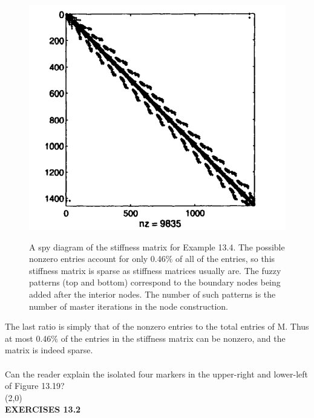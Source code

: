 \documentclass[../main.tex]{subfiles}
\begin{document}
\begin{figure}[H]
\includegraphics[width=0.9\linewidth]{4}
	\centering
	\label{pfig:ch13_1}
	\caption{A spy diagram of the stiffness matrix for Example 13.4. The possible 
nonzero entries account for only 0.46$\%$ of all of the entries, so this stiffness matrix is sparse 
as stiffness matrices usually are. The fuzzy patterns (top and bottom) correspond to the 
boundary nodes being added after the interior nodes. The number of such patterns is the 
number of master iterations in the node construction.}
\end{figure}
The last ratio is simply that of the nonzero entries to the total entries of M. Thus at 
most 0.46$\%$ of the entries in the stiffness matrix can be nonzero, and the matrix is 
indeed sparse. 
\\
\\
Can the reader explain the isolated four markers in the upper-right and lower-left 
of Figure 13.19? 
\\
\line(2,0){\textwidth}
\\
\textbf{EXERCISES 13.2}
\end{document}

